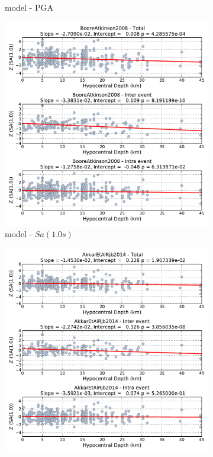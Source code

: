 \begin{figure}[htb]
\begin{subfigure}[b]{0.49\textwidth}
      \caption{\cite{Akkar_etal2014} model - PGA}
      \label{fig:pga_depth_akkar2014}
  \end{subfigure}
    \begin{subfigure}[b]{0.49\textwidth}
      \includegraphics[width=\textwidth]{./figures/residuals/BA2008_HypoDepth_Sa1.pdf}
      \caption{\cite{boore2008} model - $Sa \left( {1.0 s} \right)$}
      \label{fig:sa1_depth_ba2008}
  \end{subfigure}
      \begin{subfigure}[b]{0.49\textwidth}
      \includegraphics[width=\textwidth]{./figures/residuals/Akkar2014_HypoDepth_Sa1.pdf}

\end{subfigure}
\end{figure}
